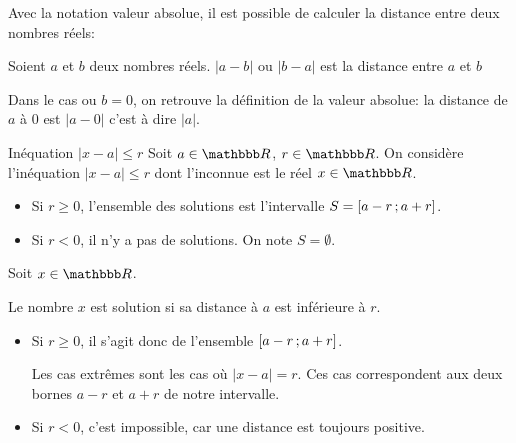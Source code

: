 \documentclass[10pt,a4paper,openany,twoside,prof]{book}
\begin{document}
\bigskip
 Avec la notation valeur absolue, il est possible de calculer la distance entre deux nombres réels:

\begin{prop}{}{}
Soient $a$ et $b$ deux nombres réels. $|a-b|$ ou $|b-a|$ est la distance entre $a$ et $b$
\end{prop}

\begin{rem}{}{}
  Dans le cas ou $b=0$, on retrouve la définition de la valeur absolue: la distance de $a$ à 0 est $|a-0|$ c'est à dire $|a|$.
\end{rem}

\begin{prop}{Inéquation $|x-a|\le r$}{}
	Soit $a\in\R$, $r\in\R$. On considère l'inéquation $|x-a|\le r$ dont l'inconnue est le réel $x\in\R$.

	\begin{itemize}
		\item Si $r\ge0$, l'ensemble des solutions est l'intervalle $S=\mathopen{[}a-r\mathclose{}\mathpunct{};a+r\mathclose{]}$.
		\item Si $r<0$, il n'y a pas de solutions. On note $S=\emptyset$.
	\end{itemize}

\end{prop}

\begin{dem}{}{}
	Soit $x\in\R$.

	Le nombre $x$ est solution si sa distance à $a$ est inférieure à $r$.

	\begin{itemize}
		\item Si $r\ge0$, il s'agit donc de l'ensemble $\mathopen{[}a-r\mathclose{}\mathpunct{};a+r\mathclose{]}$.

		Les cas extrêmes sont les cas où $|x-a|=r$. Ces cas correspondent aux deux bornes $a-r$ et $a+r$ de notre intervalle.

		\item Si $r<0$, c'est impossible, car une distance est toujours positive.
	\end{itemize}
\end{dem}
\end{document}
